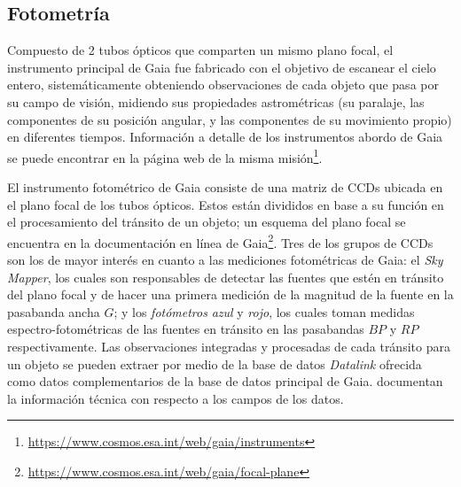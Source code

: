 \subsection{Fotometría}

Compuesto de 2 tubos ópticos que comparten un mismo plano focal, el instrumento
principal de Gaia fue fabricado con el objetivo de escanear el cielo entero,
sistemáticamente obteniendo observaciones de cada objeto que pasa por su campo
de visión, midiendo sus propiedades astrométricas (su paralaje, las componentes
de su posición angular, y las componentes de su movimiento propio) en diferentes
tiempos. Información a detalle de los instrumentos abordo de Gaia se puede
encontrar en la página web de la misma
misión\footnote{\url{https://www.cosmos.esa.int/web/gaia/instruments}}. 

El instrumento fotométrico de Gaia consiste de una matriz de CCDs ubicada en el
plano focal de los tubos ópticos. Estos están divididos en base a su función en
el procesamiento del tránsito de un objeto; un esquema del plano focal se
encuentra en la documentación en línea de
Gaia\footnote{\url{https://www.cosmos.esa.int/web/gaia/focal-plane}}. Tres de
los grupos de CCDs son los de mayor interés en cuanto a las mediciones
fotométricas de Gaia: el \textit{Sky Mapper}, los cuales son responsables de
detectar las fuentes que estén en tránsito del plano focal y de hacer una
primera medición de la magnitud de la fuente en la pasabanda ancha $G$; y los
\textit{fotómetros} \textit{azul} y \textit{rojo}, los cuales toman medidas
espectro-fotométricas de las fuentes en tránsito en las pasabandas $BP$ y $RP$
respectivamente. Las observaciones integradas y procesadas de cada tránsito para
un objeto se pueden extraer por medio de la base de datos \textit{Datalink}
ofrecida como datos complementarios de la base de datos principal de Gaia.
 documentan la información
técnica con respecto a los campos de los datos.

